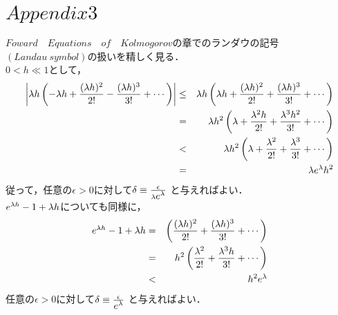 \documentclass[a4j,papersize,disablejfam,slide,14pt]{jsarticle}
\def\exp#1{\mbox{$ e^{#1} $}} %
\begin{document}
\section{$Appendix3$}
	$Foward\quad Equations\quad of\quad Kolmogorov$の章でのランダウの記号$(Landau\ symbol)$の扱いを精しく見る．\\
	$0 < h \ll 1$として，
    \begin{eqnarray}
    	\left| \lambda h \left(- \lambda h + \frac{(\lambda h)^2}{2!} - \frac{(\lambda h)^3}{3!} + \cdots \right) \right|
        &\leq& \lambda h \left(\lambda h + \frac{(\lambda h)^2}{2!} + \frac{(\lambda h)^3}{3!} + \cdots \right) \\
        &=& \lambda h^2 \left(\lambda + \frac{\lambda^2 h}{2!} + \frac{\lambda^3 h^2}{3!} + \cdots \right) \\
        &<& \lambda h^2 \left(\lambda + \frac{\lambda^2}{2!} + \frac{\lambda^3}{3!} + \cdots \right) \\
        &=& \lambda \exp{\lambda} h^2
    \end{eqnarray}
    従って，任意の$\epsilon > 0$に対して$\delta \equiv \frac{\epsilon}{\lambda \exp{\lambda}}$ と与えればよい．\\
    $\exp{\lambda h} - 1 + \lambda h$についても同様に，
    \begin{eqnarray}
    	\exp{\lambda h} - 1 + \lambda h &=& \left(\frac{(\lambda h)^2}{2!} + \frac{(\lambda h)^3}{3!} + \cdots \right) \\
        &=& h^2 \left(\frac{\lambda^2}{2!} + \frac{\lambda^3 h}{3!} + \cdots \right) \\
        &<& h^2 \exp{\lambda}
    \end{eqnarray}
    任意の$\epsilon > 0$に対して$\delta \equiv \frac{\epsilon}{\exp{\lambda}}$ と与えればよい．
\end{document}
